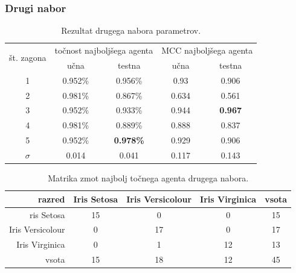 \subsubsection{Drugi nabor}
\begin{table}[H]
    \caption{Rezultat drugega nabora parametrov.}
    \begin{center}
        \begin{tabular}{|| c | c c || c c ||}
            \hline
            \multirow{2}{*}{št. zagona} & \multicolumn{2}{c||}{točnost najboljšega agenta} & \multicolumn{2}{c||}{MCC najboljšega agenta} \\ \cline{2-5}
            & učna    & testna           & učna  & testna         \\
            \hline
            1        & 0.952\% & 0.956\%          & 0.93  & 0.906          \\
            \hline
            2        & 0.981\% & 0.867\%          & 0.634 & 0.561          \\
            \hline
            3        & 0.952\% & 0.933\%          & 0.944 & \textbf{0.967} \\
            \hline
            4        & 0.981\% & 0.889\%          & 0.888 & 0.837          \\
            \hline
            5        & 0.952\% & \textbf{0.978\%} & 0.929 & 0.906          \\
            \hline
            $\sigma$ & 0.014   & 0.041            & 0.117 & 0.143          \\
            \hline
        \end{tabular}
    \end{center}
    \label{tab:iris_result_2}
\end{table}

\begin{table}[H]
    \centering
    \caption{Matrika zmot najbolj točnega agenta drugega nabora.}
    \begin{tabular}{||rcccc||}
        \hline
        razred           & Iris Setosa & Iris Versicolour & Iris Virginica & vsota \\ \hline
        ris Setosa       & 15          & 0                & 0              & 15    \\ \hline
        Iris Versicolour & 0           & 17               & 0              & 17    \\ \hline
        Iris Virginica   & 0           & 1                & 12             & 13    \\ \hline
        vsota            & 15          & 18               & 12             & 45    \\ \hline
    \end{tabular}
    \label{tab:iris_acc_2}
\end{table}

